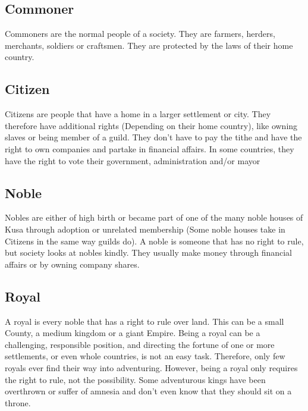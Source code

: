 \subsection{Commoner}

Commoners are the normal people of a society. They are farmers, herders, merchants, soldiers or craftsmen. They are protected by the laws of their home country. 

\subsection{Citizen}

Citizens are people that have a home in a larger settlement or city. They therefore have additional rights (Depending on their home country), like owning slaves or being member of a guild. They don’t have to pay the tithe and have the right to own companies and partake in financial affairs. In some countries, they have the right to vote their government, administration and/or mayor

\subsection{Noble}

Nobles are either of high birth or became part of one of the many noble houses of Kusa through adoption or unrelated membership (Some noble houses take in Citizens in the same way guilds do). A noble is someone that has no right to rule, but society looks at nobles kindly. They usually make money through financial affairs or by owning company shares.

\subsection{Royal}

A royal is every noble that has a right to rule over land. This can be a small County, a medium kingdom or a giant Empire. Being a royal can be a challenging, responsible position, and directing the fortune of one or more settlements, or even whole countries, is not an easy task. Therefore, only few royals ever find their way into adventuring. However, being a royal only requires the right to rule, not the possibility. Some adventurous kings have been overthrown or suffer of amnesia and don’t even know that they should sit on a throne.